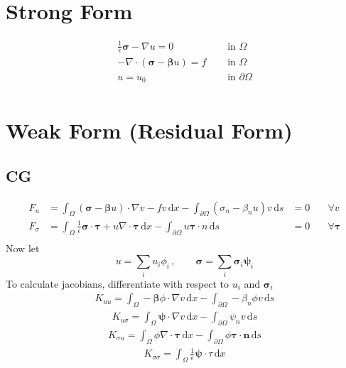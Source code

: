 \documentclass[a4paper]{article}
\def\d{\,\mathrm{d}}
\def\dx{\d x}
\def\ds{\d s}
\def\btau{\boldsymbol\tau}
\def\bsigma{\boldsymbol\sigma}
\def\bbeta{\boldsymbol\beta}
\def\bpsi{\boldsymbol\psi}
\def\bn{\mathbf{n}}
\begin{document}
\section*{Strong Form}
\begin{align*}
\frac{1}{\epsilon}\bsigma-\nabla u=0 & \quad\text{ in }\Omega\\
-\nabla\cdot(\bsigma-\bbeta u)=f & \quad\text{ in }\Omega\\
u=u_0 & \quad\text{ in }\partial\Omega\\
\end{align*}
\section*{Weak Form (Residual Form)}
\subsection*{CG}
\begin{align*}
F_u&=\int_\Omega(\bsigma-\bbeta u)\cdot\nabla v-fv\dx
- \int_{\partial\Omega }(\sigma_n-\beta_nu)v\ds
&=0 & \quad\forall v\\
F_\sigma&=\int_\Omega\frac{1}{\epsilon}\bsigma\cdot\btau+u\nabla\cdot\btau\dx
-\int_{\partial \Omega}u\btau\cdot n\ds&=0 & \quad\forall\btau\\
\end{align*}
Now let
\[
u=\sum_iu_i\phi_i\,,\quad\quad
\bsigma=\sum_i\bsigma_i\bpsi_i
\]
To calculate jacobians, differentiate with respect to $u_i$ and $\bsigma_i$
\begin{align*}
K_{uu}=\int_\Omega-\bbeta\phi\cdot\nabla v\dx-\int_{\partial\Omega}-\beta_n\phi v\ds
\end{align*}
\begin{align*}
K_{u\sigma}=\int_\Omega\bpsi\cdot\nabla v\dx-\int_{\partial\Omega}\psi_nv\ds
\end{align*}
\begin{align*}
K_{\sigma
u}=\int_\Omega\phi\nabla\cdot\btau\dx-\int_{\partial\Omega}\phi\btau\cdot\bn\ds
\end{align*}
\begin{align*}
K_{\sigma\sigma}=\int_\Omega\frac{1}{\epsilon}\bpsi\cdot\tau\dx
\end{align*}
\end{document}
